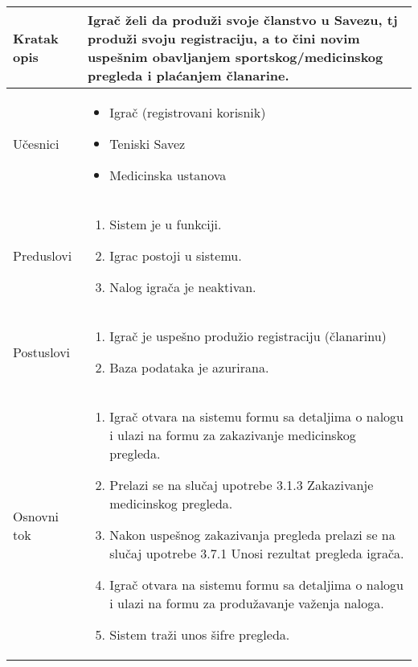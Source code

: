 \documentclass{article}
\begin{document}
       \begin{longtable}{| p{} | p{} |} 
            \hline
                Kratak opis & Igrač želi da produži svoje članstvo u Savezu, tj produži svoju registraciju, a to čini novim uspešnim obavljanjem sportskog/medicinskog pregleda i plaćanjem članarine.\\ 
            \hline    
                Učesnici & \begin{itemize}
                    \item Igrač (registrovani korisnik)
                    \item Teniski Savez
                    \item Medicinska ustanova
                \end{itemize} \\
            \hline
               Preduslovi & \begin{enumerate}
                   \item Sistem je u funkciji.
                   \item Igrac postoji u sistemu.
                   \item Nalog igrača je neaktivan.
               \end{enumerate}\\
            \hline  
                Postuslovi & \begin{enumerate}
                    \item Igrač je uspešno produžio registraciju (članarinu)
                    \item Baza podataka je azurirana.
                \end{enumerate}\\
            \hline
                Osnovni tok & \begin{enumerate}
                    \item Igrač otvara na sistemu formu sa detaljima o nalogu i ulazi na formu za zakazivanje medicinskog pregleda.
                    \item Prelazi se na slučaj upotrebe 3.1.3 Zakazivanje medicinskog pregleda.
                    \item Nakon uspešnog zakazivanja pregleda prelazi se na slučaj upotrebe 3.7.1 Unosi rezultat pregleda igrača.
                    \item Igrač otvara na sistemu formu sa detaljima o nalogu i ulazi na formu za produžavanje važenja naloga.
                    \item Sistem traži unos šifre pregleda.

\end{enumerate}
\end{longtable}
\end{document}
